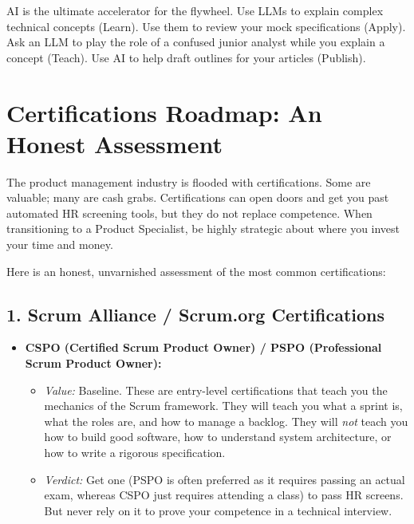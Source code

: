 \documentclass[
  11pt,
  openany,
  oneside]{book}
\providecommand{\tightlist}{%
  \setlength{\itemsep}{0pt}\setlength{\parskip}{0pt}}
\begin{document}
AI is the ultimate accelerator for the flywheel. Use LLMs to explain
complex technical concepts (Learn). Use them to review your mock
specifications (Apply). Ask an LLM to play the role of a confused junior
analyst while you explain a concept (Teach). Use AI to help draft
outlines for your articles (Publish).

\bigskip

\section{Certifications Roadmap: An Honest
Assessment}\label{certifications-roadmap-an-honest-assessment}

The product management industry is flooded with certifications. Some are
valuable; many are cash grabs. Certifications can open doors and get you
past automated HR screening tools, but they do not replace competence.
When transitioning to a Product Specialist, be highly strategic about
where you invest your time and money.

Here is an honest, unvarnished assessment of the most common
certifications:

\subsection{1. Scrum Alliance / Scrum.org
Certifications}\label{scrum-alliance-scrum.org-certifications}

\begin{itemize}
\tightlist
\item
  \textbf{CSPO (Certified Scrum Product Owner) / PSPO (Professional
  Scrum Product Owner):}

  \begin{itemize}
  \tightlist
  \item
    \emph{Value:} Baseline. These are entry-level certifications that
    teach you the mechanics of the Scrum framework. They will teach you
    what a sprint is, what the roles are, and how to manage a backlog.
    They will \emph{not} teach you how to build good software, how to
    understand system architecture, or how to write a rigorous
    specification.
  \item
    \emph{Verdict:} Get one (PSPO is often preferred as it requires
    passing an actual exam, whereas CSPO just requires attending a
    class) to pass HR screens. But never rely on it to prove your
    competence in a technical interview.
  \end{itemize}
\end{itemize}
\end{document}
